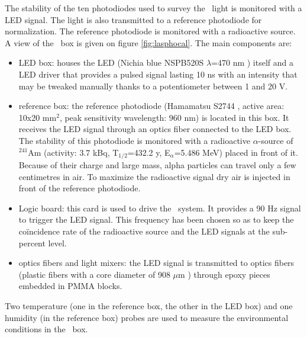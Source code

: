 The stability of the ten photodiodes used to survey the \laser~light is monitored with a LED signal. The light is also transmitted to a reference photodiode for normalization. The reference photodiode is monitored with a radioactive source.\\
A view of the \phocal~box is given on figure \ref{fig:lasphocal}. The main components are:
\begin{itemize}
\item LED box: houses the LED (Nichia blue NSPB520S $\lambda$=470 nm \cite{ref:led}) itself and a LED driver that provides a pulsed signal lasting 10 ns with an intensity that may be tweaked manually thanks to a potentiometer between 1 and 20 V.
\item reference box: the reference photodiode (Hamamatsu S2744 \cite{ref:bigphoto}, active area: 10x20 mm$^2$, peak sensitivity wavelength: 960 nm) is located in this box. It receives the LED signal through an optics fiber connected to the LED box. The stability of this photodiode is monitored with a radioactive $\alpha$-source of $^{241}$Am (activity: 3.7 kBq, T$_{1/2}$=432.2 y, E$_{\alpha}$=5.486 MeV) placed in front of it. Because of their charge and large mass, alpha particles can travel only a few centimetres in air. To maximize the radioactive signal dry air is injected in front of the reference photodiode.
\item Logic board: this card is used to drive the \phocal~system. It provides a 90 Hz signal to trigger the LED signal. This frequency has been chosen so as to keep the coïncidence rate of the radioactive source and the LED signals at the sub-percent level.
\item optics fibers and light mixers: the LED signal is transmitted to optics fibers (plastic fibers with a core diameter of 908 $\mu$m \cite{ref:fibers}) through epoxy pieces embedded in PMMA blocks.
\end{itemize}
Two temperature (one in the reference box, the other in the LED box) and one humidity (in the reference box) probes are used to measure the environmental conditions in the \phocal~box. 

